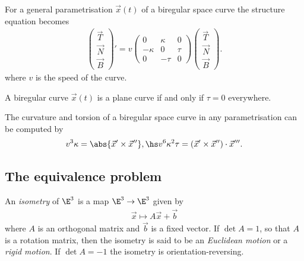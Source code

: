\documentclass{article}
\begin{document}
\begin{theorem}
    For a general parametrisation $\vec x(t)$ of a biregular space curve the structure
    equation becomes 
    \begin{align*}
        \begin{pmatrix}
            \vec T\\
            \vec N\\
            \vec B
        \end{pmatrix}'
        = v\begin{pmatrix}
            0       & \kappa & 0 \\
            -\kappa & 0      & \tau \\
            0       & -\tau  & 0
        \end{pmatrix}
        \begin{pmatrix}
            \vec T\\
            \vec N\\
            \vec B
        \end{pmatrix}.
    \end{align*}
    where $v$ is the speed of the curve.
\end{theorem}

\begin{theorem}
    A biregular curve $\vec x(t)$ is a plane curve if and only if $\tau=0$ everywhere.
\end{theorem}

\begin{theorem}
    The curvature and torsion of a biregular space curve in any parametrisation can be
    computed by
    \begin{align*}
        v^3\kappa = \abs{\vec x' \times \vec x''},\hs
        v^6\kappa^2\tau = (\vec x' \times \vec x'') \cdot \vec x'''.
    \end{align*}
\end{theorem}

\subsection{The equivalence problem}

\begin{definition}
    An \emph{isometry} of $\E^3$ is a map $\E^3\to\E^3$ given by
    \begin{align*}
        \vec x \mapsto A\vec x + \vec b
    \end{align*}
    where $A$ is an orthogonal matrix and $\vec b$ is a fixed vector. If $\det A = 1$,
    so that $A$ is a rotation matrix, then the isometry is said to be an \emph{Euclidean motion}
    or a \emph{rigid motion}. If $\det A = -1$ the isometry is orientation-reversing.
\end{definition}
\end{document}
